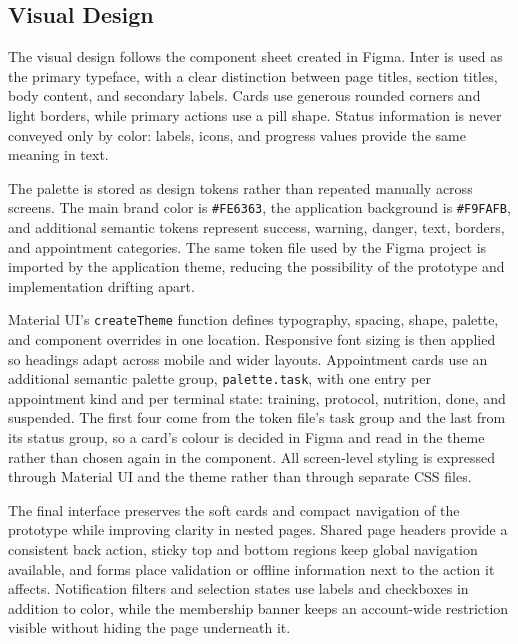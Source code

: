 \subsection{Visual Design}\label{subsect:VisualDesign}

The visual design follows the component sheet created in Figma. Inter is used as the primary typeface, with a clear distinction between page titles, section titles, body content, and secondary labels. Cards use generous rounded corners and light borders, while primary actions use a pill shape. Status information is never conveyed only by color: labels, icons, and progress values provide the same meaning in text.

The palette is stored as design tokens rather than repeated manually across screens. The main brand color is \texttt{\#FE6363}, the application background is \texttt{\#F9FAFB}, and additional semantic tokens represent success, warning, danger, text, borders, and appointment categories. The same token file used by the Figma project is imported by the application theme, reducing the possibility of the prototype and implementation drifting apart.

Material UI's \texttt{createTheme} function defines typography, spacing, shape, palette, and component overrides in one location. Responsive font sizing is then applied so headings adapt across mobile and wider layouts. Appointment cards use an additional semantic palette group, \texttt{palette.task}, with one entry per appointment kind and per terminal state: training, protocol, nutrition, done, and suspended. The first four come from the token file's task group and the last from its status group, so a card's colour is decided in Figma and read in the theme rather than chosen again in the component. All screen-level styling is expressed through Material UI and the theme rather than through separate CSS files.

The final interface preserves the soft cards and compact navigation of the prototype while improving clarity in nested pages. Shared page headers provide a consistent back action, sticky top and bottom regions keep global navigation available, and forms place validation or offline information next to the action it affects. Notification filters and selection states use labels and checkboxes in addition to color, while the membership banner keeps an account-wide restriction visible without hiding the page underneath it.
